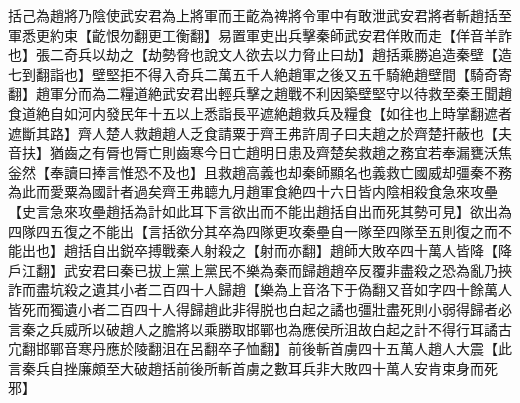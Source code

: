 括己為趙將乃陰使武安君為上將軍而王齕為禆將令軍中有敢泄武安君將者斬趙括至軍悉更約束【齕恨勿翻更工衡翻】易置軍吏出兵擊秦師武安君佯敗而走【佯音羊詐也】張二奇兵以劫之【劫勢脅也說文人欲去以力脅止曰劫】趙括乘勝追造秦壁【造七到翻詣也】壁堅拒不得入奇兵二萬五千人絶趙軍之後又五千騎絶趙壁間【騎奇寄翻】趙軍分而為二糧道絶武安君出輕兵擊之趙戰不利因築壁堅守以待救至秦王聞趙食道絶自如河内發民年十五以上悉詣長平遮絶趙救兵及糧食【如往也上時掌翻遮者遮斷其路】齊人楚人救趙趙人乏食請粟于齊王弗許周子曰夫趙之於齊楚扞蔽也【夫音扶】猶齒之有脣也脣亡則齒寒今日亡趙明日患及齊楚矣救趙之務宜若奉漏甕沃焦釡然【奉讀曰捧言惟恐不及也】且救趙高義也却秦師顯名也義救亡國威却彊秦不務為此而愛粟為國計者過矣齊王弗聼九月趙軍食絶四十六日皆内陰相殺食急來攻壘【史言急來攻壘趙括為計如此耳下言欲出而不能出趙括自出而死其勢可見】欲出為四隊四五復之不能出【言括欲分其卒為四隊更攻秦壘自一隊至四隊至五則復之而不能出也】趙括自出鋭卒搏戰秦人射殺之【射而亦翻】趙師大敗卒四十萬人皆降【降戶江翻】武安君曰秦已拔上黨上黨民不樂為秦而歸趙趙卒反覆非盡殺之恐為亂乃挾詐而盡坑殺之遺其小者二百四十人歸趙【樂為上音洛下于偽翻又音如字四十餘萬人皆死而獨遺小者二百四十人得歸趙此非得脱也白起之譎也彊壯盡死則小弱得歸者必言秦之兵威所以破趙人之膽將以乘勝取邯鄲也為應侯所沮故白起之計不得行耳譎古宂翻邯鄲音寒丹應於陵翻沮在呂翻卒子恤翻】前後斬首虜四十五萬人趙人大震【此言秦兵自挫廉頗至大破趙括前後所斬首虜之數耳兵非大敗四十萬人安肯束身而死邪】

